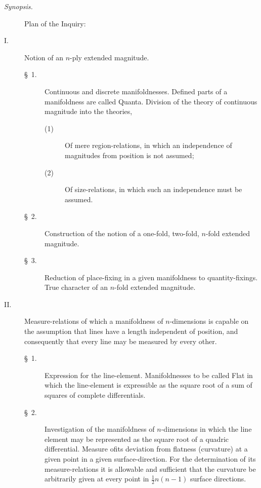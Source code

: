\documentclass[a4paper,12pt]{article}
\begin{document}
\newpage

\begin{center}
\emph{Synopsis.}
\end{center}

\begin{description}
\item[]
Plan of the Inquiry:

\item[\textmd{I.}]
Notion of an $n$-ply extended magnitude.

\begin{description}
\item[\textmd{\S~1.}]
Continuous and discrete manifoldnesses.  Defined parts of a
manifoldness are called Quanta.  Division of the theory of
continuous magnitude into the theories,
\begin{description}
\item[\textmd{(1)}]
Of mere region-relations, in which an independence of magnitudes
from position is not assumed;
\item[\textmd{(2)}]
Of size-relations, in which such an independence must be assumed.
\end{description}

\item[\textmd{\S~2.}]
Construction of the notion of a one-fold, two-fold, $n$-fold
extended magnitude.

\item[\textmd{\S~3.}]
Reduction of place-fixing in a given manifoldness to
quantity-fixings.  True character of an $n$-fold extended
magnitude.

\end{description}


\item[\textmd{II.}]
Measure-relations of which a manifoldness of $n$-dimensions is
capable on the assumption that lines have a length independent of
position, and consequently that every line may be measured by
every other.

\begin{description}
\item[\textmd{\S~1.}]
Expression for the line-element.  Manifoldnesses to be called
Flat in which the line-element is expressible as the square root
of a sum of squares of complete differentials.

\item[\textmd{\S~2.}]
Investigation of the manifoldness of $n$-dimensions in which the
line element may be represented as the square root of a quadric
differential.  Measure ofits deviation from flatness (curvature)
at a given point in a given surface-direction.  For the
determination of its measure-relations it is allowable and
sufficient that the curvature be arbitrarily given at every point
in $\frac{1}{2} n (n - 1)$ surface directions.


\end{description}
\end{description}
\end{document}
